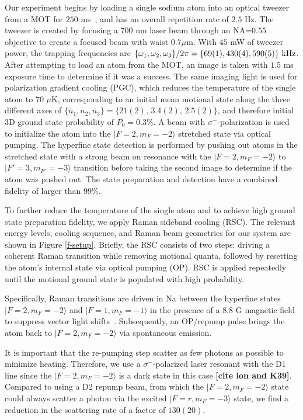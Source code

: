 \documentclass[aps,prl,twocolumn,groupedaddress]{revtex4-1}
\newcommand{\fxnote}[1]{{\textbf{[#1]}}}
\begin{document}
Our experiment begins by loading a single sodium atom into an optical tweezer from a MOT
for $250$ ms~\cite{Hutzler2017-LightShifts}, and has an overall repetition rate of $2.5$ Hz.
The tweezer is created by focusing a $700$ nm laser beam through an NA=$0.55$ objective to
create a focused beam with waist $0.7 \mu$m.
With $45$ mW of tweezer power, the trapping frequencies are
$\{\omega_1,\omega_2,\omega_3\}/2\pi = \{69(1), 430(4), 590(5)\}\ \text{\text{kHz}}$.
After attempting to load an atom from the MOT, an image is taken with $1.5$ ms exposure time to determine if it was a success.
The same imaging light is used for polarization gradient cooling (PGC), which
reduces the temperature of the single atom to $70$ $\mu$K,
corresponding to an initial mean motional state along the three different axes of
$\{\bar n_1, \bar n_2, \bar n_3\}=\{21(2),\, 3.4(2),\, 2.5(2)\}$, and therefore initial 3D ground state probability of $P_0=0.3$\%.
A beam with $\sigma^-$-polarization is used to initialize the atom into
the $|F=2, m_F=-2\rangle$ stretched state via optical pumping.
The hyperfine state detection is performed by pushing out atoms in the stretched state with a strong
beam on resonance with the $|F=2, m_F=-2\rangle$ to $|F'=3, m_{F'}=-3\rangle$ transition before
taking the second image to determine if the atom was pushed out.
The state preparation and detection have a combined fidelity of larger than $99$\%.

To further reduce the temperature of the single atom and
to achieve high ground state preparation fidelity, we apply Raman sideband cooling (RSC).
The relevant energy levels, cooling sequence, and Raman beam geometries for our system
are shown in Figure \ref{f-setup}. Briefly, the RSC consists of two steps:
driving a coherent Raman transition while removing motional quanta, followed by resetting the atom's internal state via optical pumping (OP).
RSC is applied repeatedly until the motional ground state is populated with high probability.

Specifically, Raman transitions are driven in Na between the hyperfine states
$|F=2, m_F=-2\rangle$ and  $|F=1, m_F=-1\rangle$ in the presence of a $8.8$ G magnetic field to suppress vector light shifts~\cite{Kaufman2012,Thompson2013}.
Subsequently, an OP/repump pulse brings the atom back to $|F=2, m_F=-2\rangle$
via spontaneous emission.

It is important that the re-pumping step scatter as few photons as possible to minimize heating.  Therefore, we use a $\sigma^-$-polarized laser resonant with the D1 line since the $|F=2, m_F=-2\rangle$ is a dark state in this case \fxnote{cite ion and K39}.  Compared to using a D2 repump beam, from which the $|F=2, m_F=-2\rangle$ state could always scatter a photon via the excited $|F=r, m_F=-3\rangle$ state, we find a reduction in the scattering rate of a factor of $130(20)$.
\end{document}

